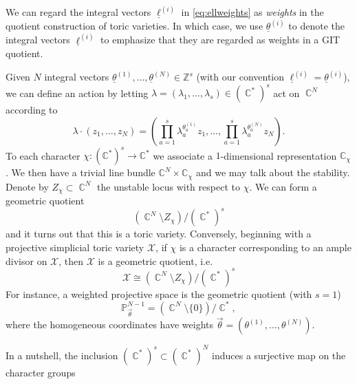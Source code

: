 \documentclass[12pt,a4paper,oneside]{amsart}
\numberwithin{equation}{section}
\theoremstyle{definition}
\theoremstyle{remark}
\DeclareMathOperator{\C}{\mathbb{C}}
\newcommand{\cP}{\mathbb{P}}
\begin{document}
We can regard the integral vectors $\underline{\ell}^{(i)} $ in \eqref{eq:ellweights} as \emph{weights}
in the quotient construction of toric varieties. In which case, we use
\(\underline{\theta}^{(i)}\) to denote the integral vectors \(\underline{\ell}^{(i)}\)
to emphasize that they are regarded as weights in a GIT quotient.

Given \(N\) integral vectors \(\underline{\theta}^{(1)},\ldots,\underline{\theta}^{(N)}\in \mathbb{Z}^{s}\)
(with our convention \(\underline{\ell}^{(i)}=\underline{\theta}^{(i)}\)), 
we can define an action by letting $\lambda=(\lambda_1, \dots, \lambda_s) \in 
(\C^{\ast})^s$ act on $\C^N$ according to
\begin{equation*}
    \lambda \cdot (z_1, \dots, z_N) = \left( \prod_{a=1}^{s} \lambda_a ^{\theta_a ^{(1)}} z_1 , \dots, \prod_{a=1}^{s} \lambda_a ^{\theta_a ^{(N)}} z_N \right).
\end{equation*}
To each character \(\chi\colon(\mathbb{C}^{\ast})^{s}\to \mathbb{C}^{\ast}\) we 
associate a \(1\)-dimensional representation \(\mathbb{C}_{\chi}\).
We then have a trivial line bundle \(\mathbb{C}^{N}\times\mathbb{C}_{\chi}\)
and we may talk about the stability.
Denote by $Z_{\chi} \subset \C^N$ the unstable locus
with respect to \(\chi\). We can
form a geometric quotient
\cite{Cox:1993fz}
\begin{equation}
\label{eq:toricquotient}
    \left( \C^N \setminus Z_{\chi}  \right) / (\C^{\ast})^s 
\end{equation}
and it turns out that this is a toric variety.
Conversely, beginning with a projective simplicial toric variety $\mathcal{X}$,
if \(\chi\) is a character corresponding to an ample divisor on $\mathcal{X}$, then 
$\mathcal{X}$ is a geometric quotient, i.e.
\begin{equation*}
    \mathcal{X} \cong \left( \C^N \setminus Z_{\chi}  \right) / (\C^{\ast})^s 
\end{equation*}
For instance, a weighted projective space is the geometric quotient (with \(s=1\))
\begin{equation*}
    \cP^{N-1}_{\vec{\theta}} = \left( \C^N \setminus \{0\} \right) / \C^{\ast},
\end{equation*}
where the homogeneous coordinates have weights $\vec{\theta}=(\theta^{(1)}, \dots, \theta^{(N)})$.\par
In a nutshell, the inclusion $ (\C^{\ast})^s \subset  (\C^{\ast})^N$ induces a surjective map on the character groups 
\end{document}
